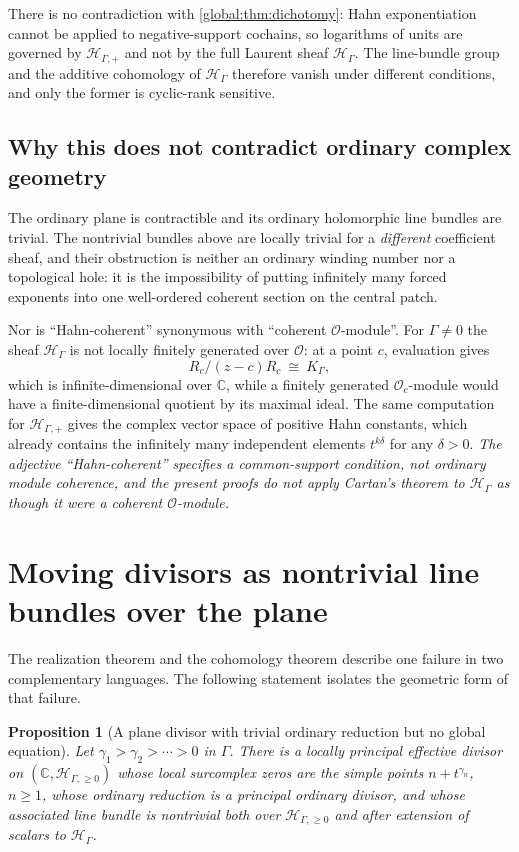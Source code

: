 \documentclass[11pt,letterpaper]{article}
\newtheorem{proposition}[proposition]{Proposition}
\theoremstyle{definition}
\theoremstyle{remark}
\newcommand{\C}{\mathbb C}
\newcommand{\OO}{\mathcal O}
\newcommand{\HH}{\mathscr H_\Gamma}
\newcommand{\HP}{\mathscr H_{\Gamma,+}}
\newcommand{\HI}{\mathscr H_{\Gamma,\ge0}}
\newcommand{\KK}{K_\Gamma}
\numberwithin{equation}{section}
\begin{document}
There is no contradiction with \cref{global:thm:dichotomy}: Hahn exponentiation cannot be applied to negative-support cochains, so logarithms of units are governed by $\HP$ and not by the full Laurent sheaf $\HH$. The line-bundle group and the additive cohomology of $\HH$ therefore vanish under different conditions, and only the former is cyclic-rank sensitive.

\subsection{Why this does not contradict ordinary complex geometry}\label{global:sub:notcoherent}

The ordinary plane is contractible and its ordinary holomorphic line bundles are trivial. The nontrivial bundles above are locally trivial for a \emph{different} coefficient sheaf, and their obstruction is neither an ordinary winding number nor a topological hole: it is the impossibility of putting infinitely many forced exponents into one well-ordered coherent section on the central patch.

Nor is ``Hahn-coherent'' synonymous with ``coherent $\OO$-module''. For $\Gamma\ne0$ the sheaf $\HH$ is not locally finitely generated over $\OO$: at a point $c$, evaluation gives
\[
  R_c/(z-c)R_c\ \cong\ \KK,
\]
which is infinite-dimensional over $\C$, while a finitely generated $\OO_c$-module would have a finite-dimensional quotient by its maximal ideal. The same computation for $\HP$ gives the complex vector space of positive Hahn constants, which already contains the infinitely many independent elements $t^{k\delta}$ for any $\delta>0$. \emph{The adjective ``Hahn-coherent'' specifies a common-support condition, not ordinary module coherence, and the present proofs do not apply Cartan's theorem to $\HH$ as though it were a coherent $\OO$-module.}

\section{Moving divisors as nontrivial line bundles over the plane}\label{global:sec:geometric}

The realization theorem and the cohomology theorem describe one failure in two complementary languages. The following statement isolates the geometric form of that failure.

\begin{proposition}[A plane divisor with trivial ordinary reduction but no global equation]\label{global:prop:Cartierexample}
Let $\gamma_1>\gamma_2>\cdots>0$ in $\Gamma$. There is a locally principal effective divisor on $(\C,\HI)$ whose local surcomplex zeros are the simple points $n+t^{\gamma_n}$, $n\ge1$, whose ordinary reduction is a principal ordinary divisor, and whose associated line bundle is nontrivial both over $\HI$ and after extension of scalars to $\HH$.
\end{proposition}
\end{document}
